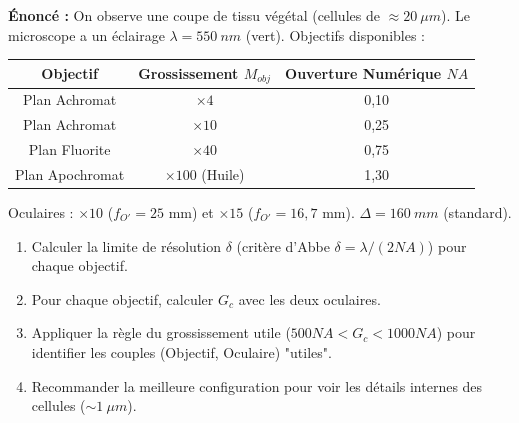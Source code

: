 \documentclass[11pt]{article}
\begin{document}
\begin{exoresolu}
\textbf{Énoncé :} On observe une coupe de tissu végétal (cellules de $\approx \SI{20}{\mu m}$). Le microscope a un éclairage $\lambda = \SI{550}{nm}$ (vert). Objectifs disponibles :
\begin{center}
\begin{tabular}{|c|c|c|}\hline
\textbf{Objectif} & \textbf{Grossissement $M_{obj}$} & \textbf{Ouverture Numérique $NA$} \\ \hline
Plan Achromat & $\times 4$ & 0,10 \\
Plan Achromat & $\times 10$ & 0,25 \\
Plan Fluorite & $\times 40$ & 0,75 \\
Plan Apochromat & $\times 100$ (Huile) & 1,30 \\ \hline
\end{tabular}
\end{center}
Oculaires : $\times 10$ ($f_{O'}=25$ mm) et $\times 15$ ($f_{O'}=16,7$ mm). $\Delta = \SI{160}{mm}$ (standard).
\begin{enumerate}
    \item Calculer la limite de résolution $\delta$ (critère d'Abbe $\delta = \lambda / (2 NA)$) pour chaque objectif.
    \item Pour chaque objectif, calculer $G_c$ avec les deux oculaires.
    \item Appliquer la règle du grossissement utile ($500 NA < G_c < 1000 NA$) pour identifier les couples (Objectif, Oculaire) "utiles".
    \item Recommander la meilleure configuration pour voir les détails internes des cellules ($\sim \SI{1}{\mu m}$).
\end{enumerate}


\end{exoresolu}
\end{document}
